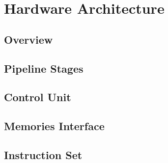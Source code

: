 \chapter{Hardware Architecture}

\section{Overview}
\section{Pipeline Stages}
\section{Control Unit}
\section{Memories Interface}
\section{Instruction Set}